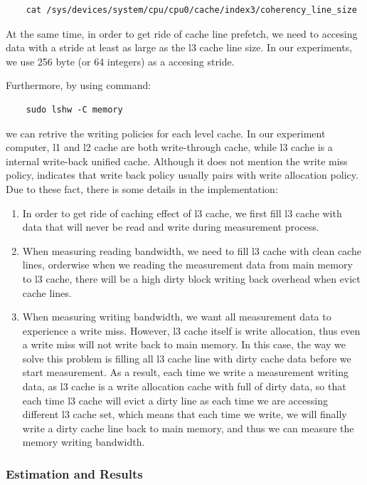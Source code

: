\begin{lstlisting}
    cat /sys/devices/system/cpu/cpu0/cache/index3/coherency_line_size
\end{lstlisting}

At the same time, in order to get ride of cache line prefetch, we need to accesing data with a stride at least as large as the l3 cache line size. In our experiments, we use 256 byte (or 64 integers) as a accesing stride.

Furthermore, by using command:

\begin{lstlisting}
    sudo lshw -C memory
\end{lstlisting}

we can retrive the writing policies for each level cache. In our experiment computer, l1 and l2 cache are both write-through cache, while l3 cache is a internal write-back unified cache. Although it does not mention the write miss policy, \cite{wiki:cache} indicates that write back policy usually pairs with write allocation policy. Due to these fact, there is some details in the implementation:

\begin{enumerate}
    \item In order to get ride of caching effect of l3 cache, we first fill l3 cache with data that will never be read and write during measurement process.
    \item When measuring reading bandwidth, we need to fill l3 cache with clean cache lines, orderwise when we reading the measurement data from main memory to l3 cache, there will be a high dirty block writing back overhead when evict cache lines.
    \item When measuring writing bandwidth, we want all measurement data to experience a write miss. However, l3 cache itself is write allocation, thus even a write miss will not write back to main memory. In this case, the way we solve this problem is filling all l3 cache line with dirty cache data before we start measurement. As a result, each time we write a measurement writing data, as l3 cache is a write allocation cache with full of dirty data, so that each time l3 cache will evict a dirty line as each time we are accessing different l3 cache set, which means that each time we write, we will finally write a dirty cache line back to main memory, and thus we can measure the memory writing bandwidth.
\end{enumerate}

\subsubsection{Estimation and Results}
\label{Memory_bandwidth_result_section}

